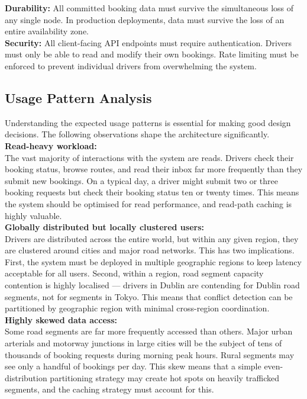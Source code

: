 \documentclass{article}
\begin{document}
\textbf{Durability:} All committed booking data must survive the simultaneous loss of any single node. In production deployments, data must survive the loss of an entire availability zone. \\

\textbf{Security:} All client-facing API endpoints must require authentication. Drivers must only be able to read and modify their own bookings. Rate limiting must be enforced to prevent individual drivers from overwhelming the system.

\subsection{Usage Pattern Analysis}
Understanding the expected usage patterns is essential for making good design decisions. The following observations shape the architecture significantly.\\

\textbf{Read-heavy workload:}\\ The vast majority of interactions with the system are reads. Drivers check their booking status, browse routes, and read their inbox far more frequently than they submit new bookings. On a typical day, a driver might submit two or three booking requests but check their booking status ten or twenty times. This means the system should be optimised for read performance, and read-path caching is highly valuable.\\

\textbf{Globally distributed but locally clustered users:}\\ Drivers are distributed across the entire world, but within any given region, they are clustered around cities and major road networks. This has two implications. First, the system must be deployed in multiple geographic regions to keep latency acceptable for all users. Second, within a region, road segment capacity contention is highly localised — drivers in Dublin are contending for Dublin road segments, not for segments in Tokyo. This means that conflict detection can be partitioned by geographic region with minimal cross-region coordination. \\

\textbf{Highly skewed data access:}\\
Some road segments are far more frequently accessed than others. Major urban arterials and motorway junctions in large cities will be the subject of tens of thousands of booking requests during morning peak hours. Rural segments may see only a handful of bookings per day. This skew means that a simple even-distribution partitioning strategy may create hot spots on heavily trafficked segments, and the caching strategy must account for this.\\
\end{document}
